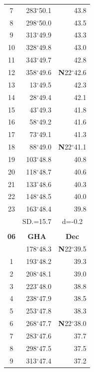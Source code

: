 \documentclass[10pt, a4paper]{report}
\begin{document}
\begin{scriptsize}
\begin{tabular*}{0.2\textwidth}[t]{@{\extracolsep{\fill}}|c|rr|}
7 & 283$^\circ$50.1 & 43.8\\
8 & 298$^\circ$50.0 & 43.5\\
9 & 313$^\circ$49.9 & \raisebox{0.24ex}{\boldmath$\cdot$~\boldmath$\cdot$~~}43.3\\
10 & 328$^\circ$49.8 & 43.0\\
11 & 343$^\circ$49.7 & 42.8\\[2Pt]
12 & 358$^\circ$49.6 & \textbf{N}22$^\circ$42.6\\
13 & 13$^\circ$49.5 & 42.3\\
14 & 28$^\circ$49.4 & 42.1\\
15 & 43$^\circ$49.3 & \raisebox{0.24ex}{\boldmath$\cdot$~\boldmath$\cdot$~~}41.8\\
16 & 58$^\circ$49.2 & 41.6\\
17 & 73$^\circ$49.1 & 41.3\\[2Pt]
18 & 88$^\circ$49.0 & \textbf{N}22$^\circ$41.1\\
19 & 103$^\circ$48.8 & 40.8\\
20 & 118$^\circ$48.7 & 40.6\\
21 & 133$^\circ$48.6 & \raisebox{0.24ex}{\boldmath$\cdot$~\boldmath$\cdot$~~}40.3\\
22 & 148$^\circ$48.5 & 40.0\\
23 & 163$^\circ$48.4 & 39.8\\
\hline
\rule{0pt}{2.4ex} & \multicolumn{1}{c}{SD.=15.7} & \multicolumn{1}{c|}{d=-0.2}\\
\hline
\multicolumn{1}{c}{}\\[-0.5ex]\hline
\multicolumn{1}{|c|}{\rule{0pt}{2.6ex}\textbf{06}} & \multicolumn{1}{c}{\textbf{GHA}} & \multicolumn{1}{c|}{\textbf{Dec}}\\
\hline\rule{0pt}{2.6ex}\noindent
0 & 178$^\circ$48.3 & \textbf{N}22$^\circ$39.5\\
1 & 193$^\circ$48.2 & 39.3\\
2 & 208$^\circ$48.1 & 39.0\\
3 & 223$^\circ$48.0 & \raisebox{0.24ex}{\boldmath$\cdot$~\boldmath$\cdot$~~}38.8\\
4 & 238$^\circ$47.9 & 38.5\\
5 & 253$^\circ$47.8 & 38.3\\[2Pt]
6 & 268$^\circ$47.7 & \textbf{N}22$^\circ$38.0\\
7 & 283$^\circ$47.6 & 37.7\\
8 & 298$^\circ$47.5 & 37.5\\
9 & 313$^\circ$47.4 & \raisebox{0.24ex}{\boldmath$\cdot$~\boldmath$\cdot$~~}37.2\\

\end{tabular*}
\end{scriptsize}
\end{document}
